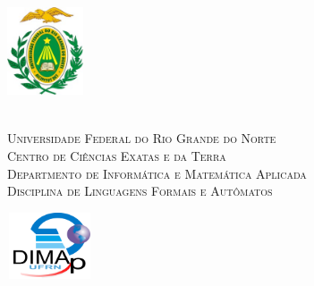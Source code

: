 
\begin{titlepage}
	\begin{center}
		
		\begin{minipage}{2.3cm}
			\begin{center}
				\includegraphics[width=2.25cm, height=2.68cm]{Imagens/Brasao-UFRN.jpg}
			\end{center}
		\end{minipage}
		\begin{minipage}{11.15cm}
			\begin{center}
				\begin{espacosimples}
					{\small \ \\
                       \textsc{Universidade Federal do Rio Grande do Norte}		   			\\
							  \textsc{Centro de Ciências Exatas e da Terra}					\\
							  \textsc{Departmento de Informática e Matemática Aplicada}	   	\\
							  \textsc{Disciplina de Linguagens Formais e Autômatos}}   				\\
				\end{espacosimples}
			\end{center}
		\end{minipage}
		\begin{minipage}{2.3cm}
			\begin{center}
				\includegraphics[width=2.52cm, height=1.96cm]{Imagens/Logotipo-DIMAp.png}
			\end{center}
		\end{minipage}
			

\end{center}
\end{titlepage}
